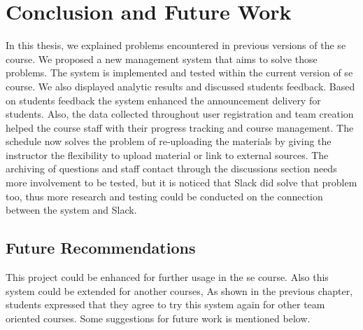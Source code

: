 \chapter{Conclusion and Future Work}
\label{chap:conclusion}
In this thesis, we explained problems encountered in previous versions of the \ac{se} course. We proposed a new management
system that aims to solve those problems. The system is implemented and tested within the current version of \ac{se} course. We
also displayed analytic results and discussed students feedback. Based on students feedback the system enhanced the announcement delivery for
students. Also, the data collected throughout user registration and team creation helped the course staff with their progress tracking and
course management. The schedule now solves the problem of re-uploading the materials by giving the instructor the flexibility to upload material or
link to external sources. The archiving of questions and staff contact through the discussions section needs more involvement to be tested,
but it is noticed that Slack\texttrademark{} did solve that problem too, thus more research and testing could be conducted
on the connection between the system and Slack\texttrademark{}.

\section{Future Recommendations}
\label{sec:future-work}
This project could be enhanced for further usage in the \ac{se} course. Also this system could be extended for another courses,
As shown in the previous chapter, students expressed that they agree to try this system again for other team oriented courses. Some
suggestions for future work is mentioned below.

